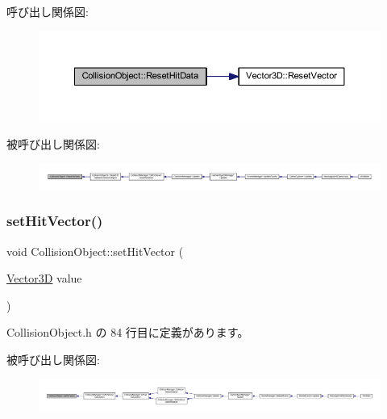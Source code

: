 呼び出し関係図\+:\nopagebreak
\begin{figure}[H]
\begin{center}
\leavevmode
\includegraphics[width=350pt]{class_collision_object_a92dd5d21c6674605d290e0d37d64505a_cgraph}
\end{center}
\end{figure}
被呼び出し関係図\+:
\nopagebreak
\begin{figure}[H]
\begin{center}
\leavevmode
\includegraphics[width=350pt]{class_collision_object_a92dd5d21c6674605d290e0d37d64505a_icgraph}
\end{center}
\end{figure}
\mbox{\label{class_collision_object_a1087fa9cebfe0b1675923807b73d8868}} 
\subsubsection{\texorpdfstring{set\+Hit\+Vector()}{setHitVector()}}
{\footnotesize\ttfamily void Collision\+Object\+::set\+Hit\+Vector (\begin{DoxyParamCaption}\item[{\mbox{\hyperlink{class_vector3_d}{Vector3D}}}]{value }\end{DoxyParamCaption})\hspace{0.3cm}{\ttfamily [inline]}}



 Collision\+Object.\+h の 84 行目に定義があります。

被呼び出し関係図\+:
\nopagebreak
\begin{figure}[H]
\begin{center}
\leavevmode
\includegraphics[width=350pt]{class_collision_object_a1087fa9cebfe0b1675923807b73d8868_icgraph}
\end{center}
\end{figure}
\mbox{\label{class_collision_object_a3000144caea71e39cbdafebb249fef7e}} 
